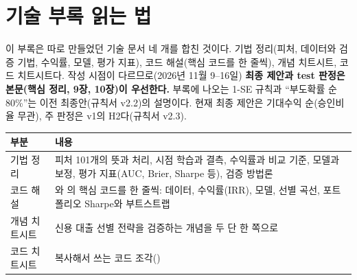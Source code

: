 \chapter{기술 부록 읽는 법}
\begin{warnbox}[먼저 읽기]
이 부록은 따로 만들었던 기술 문서 네 개를 합친 것이다. 기법 정리(피처, 데이터와 검증 기법, 수익률, 모델, 평가 지표), 코드 해설(핵심 코드를 한 줄씩), 개념 치트시트, 코드 치트시트다. 작성 시점이 다르므로(2026년 11월 9--16일) \textbf{최종 제안과 test 판정은 본문(핵심 정리, 9장, 10장)이 우선한다.} 부록에 나오는 1-SE 규칙과 ``부도확률 순 80\%''는 이전 최종안(규칙서 v2.2)의 설명이다. 현재 최종 제안은 기대수익 순(승인비율 무관), 주 판정은 v1의 H2다(규칙서 v2.3).
\end{warnbox}
\begin{table}[H]\centering\small
\begin{tabularx}{\linewidth}{@{}p{45mm}L@{}}\toprule
부분 & 내용\\\midrule
기법 정리 & 피처 101개의 뜻과 처리, 시점 학습과 결측, 수익률과 비교 기준, 모델과 보정, 평가 지표(AUC, Brier, Sharpe 등), 검증 방법론\\
코드 해설 & 와 의 핵심 코드를 한 줄씩: 데이터, 수익률(IRR), 모델, 선별 곡선, 포트폴리오 Sharpe와 부트스트랩\\
개념 치트시트 & 신용 대출 선별 전략을 검증하는 개념을 두 단 한 쪽으로\\
코드 치트시트 & 복사해서 쓰는 코드 조각()\\\bottomrule
\end{tabularx}
\end{table}

